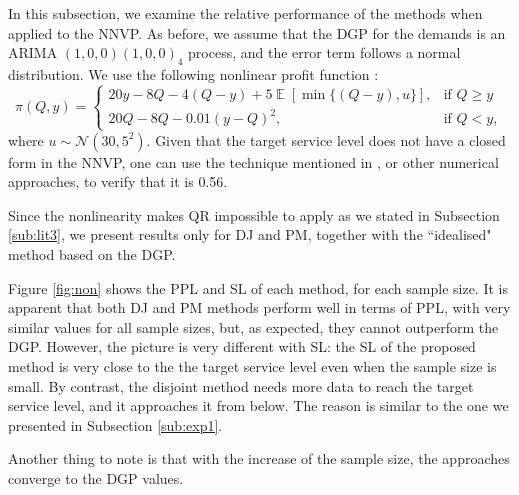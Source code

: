 \documentclass{article}
\DeclareMathOperator{\E}{\mathbb{E}}
\begin{document}
In this subsection, we examine the relative performance of the methods when applied to the NNVP. As before, we assume that the DGP for the demands is an ARIMA $(1,0,0)(1,0,0)_4$ process, and the error term follows a normal distribution. We use the following nonlinear profit function \cite{KK18}:
\[
    \pi(Q,y)=
    \begin{cases}
        20y-8Q-4(Q-y)+5\E[\min \{(Q-y),u\}],& \text{if } Q\geq y\\
        20Q-8Q-0.01(y-Q)^2,& \text{if } Q< y,
    \end{cases}
\]
where $u\sim \mathcal{N}(30,5^2)$. Given that the target service level does not have a closed form in the NNVP, one can use the technique mentioned in \cite{KK18}, or other numerical approaches, to verify that it is 0.56.

Since the nonlinearity makes QR impossible to apply as we stated in Subsection \ref{sub:lit3}, we present results only for DJ and PM, together with the ``idealised" method based on the DGP.

Figure \ref{fig:non} shows the PPL and SL of each method, for each sample size. It is apparent that both DJ and PM methods perform well in terms of PPL, with very similar values for all sample sizes, but, as expected, they cannot outperform the DGP. However, the picture is very different with SL: the SL of the proposed method is very close to the the target service level even when the sample size is small. By contrast, the disjoint method needs more data to reach the target service level, and it approaches it from below. The reason is similar to the one we presented in Subsection \ref{sub:exp1}. 

Another thing to note is that with the increase of the sample size, the approaches converge to the DGP values.
\end{document}
